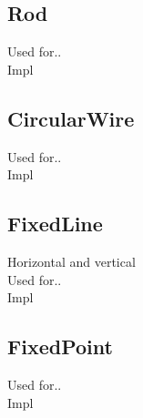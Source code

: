 \subsection{Rod}
Used for..\\
Impl\\

\subsection{CircularWire}
Used for..\\
Impl\\

\subsection{FixedLine}
Horizontal and vertical\\
Used for..\\
Impl\\

\subsection{FixedPoint}
Used for..\\
Impl\\
